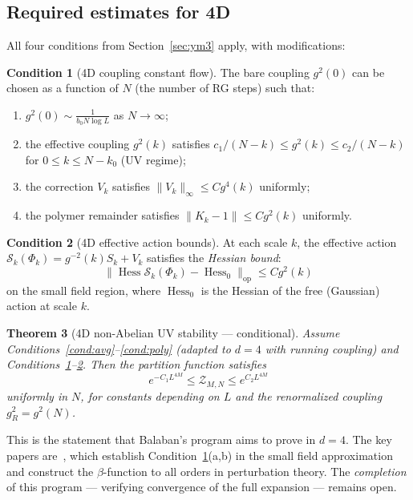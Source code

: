 \documentclass[11pt,a4paper]{article}
\theoremstyle{plain}
\newtheorem{theorem}{Theorem}[section]
\theoremstyle{definition}
\newtheorem{condition}[theorem]{Condition}
\theoremstyle{remark}
\newcommand{\Hess}{\operatorname{Hess}}
\newcommand{\cS}{\mathcal{S}}
\newcommand{\cZ}{\mathcal{Z}}
\begin{document}
\subsection{Required estimates for 4D}

All four conditions from Section~\ref{sec:ym3}
apply, with modifications:

\begin{condition}[4D coupling constant flow]
\label{cond:4d}
The bare coupling $g^2(0)$ can be chosen as a
function of $N$ (the number of RG steps) such that:
\begin{enumerate}[label=(\alph*),nosep]
  \item $g^2(0) \sim \frac{1}{b_0 N \log L}$ as $N \to \infty$;
  \item the effective coupling $g^2(k)$ satisfies
    $c_1/(N-k) \le g^2(k) \le c_2/(N-k)$ for
    $0 \le k \le N - k_0$ (UV regime);
  \item the correction $V_k$ satisfies
    $\|V_k\|_\infty \le C g^4(k)$ uniformly;
  \item the polymer remainder satisfies
    $\|K_k - 1\| \le C g^2(k)$ uniformly.
\end{enumerate}
\end{condition}

\begin{condition}[4D effective action bounds]
\label{cond:4d_action}
At each scale $k$, the effective action
$\cS_k(\Phi_k) = g^{-2}(k) S_k + V_k$
satisfies the \emph{Hessian bound}:
\begin{equation}\label{eq:hessian_4d}
  \|\Hess \cS_k(\Phi_k) - \Hess_0\|_{\text{op}}
  \le C g^2(k)
\end{equation}
on the small field region, where $\Hess_0$ is the
Hessian of the free (Gaussian) action at scale $k$.
\end{condition}

\begin{theorem}[4D non-Abelian UV stability ---
  conditional]\label{thm:4d_uv}
Assume Conditions~\ref{cond:avg}--\ref{cond:poly}
(adapted to $d=4$ with running coupling)
and Conditions~\ref{cond:4d}--\ref{cond:4d_action}.
Then the partition function satisfies
\begin{equation}
  e^{-C_1 L^{4M}} \le \cZ_{M,N}
  \le e^{C_2 L^{4M}}
\end{equation}
uniformly in $N$, for constants depending on $L$
and the renormalized coupling $g^2_R = g^2(N)$.
\end{theorem}

This is the statement that Balaban's program
aims to prove in $d=4$. The key papers
are~\cite{Bal87,Bal88a,Bal88b,Bal89}, which establish
Condition~\ref{cond:4d}(a,b) in the small field
approximation and construct the $\beta$-function
to all orders in perturbation theory.
The \emph{completion} of this program ---
verifying convergence of the full expansion ---
remains open.
\end{document}
